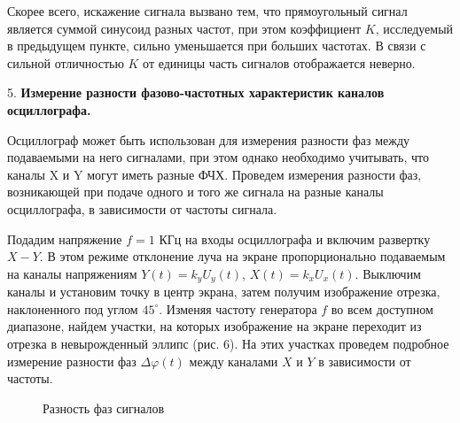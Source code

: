 \documentclass[14pt]{article}
\begin{document}
\begin{figure}[h!!]
	\label{fig:image}
\end{figure}

\newpage

Скорее всего, искажение сигнала вызвано тем, что прямоугольный сигнал является суммой синусоид разных частот, при этом коэффициент $K$, исследуемый в предыдущем пункте, сильно уменьшается при больших частотах. В связи с сильной отличностью $K$ от единицы часть сигналов отображается неверно.

\vspace{0.5cm}
5. \textbf{Измерение разности фазово-частотных характеристик каналов осциллографа.}

Осциллограф может быть использован для измерения разности фаз между подаваемыми на него сигналами, при этом однако необходимо учитывать, что каналы X и Y могут иметь разные ФЧХ. Проведем измерения разности фаз, возникающей при подаче одного и того же сигнала на разные каналы осциллографа, в зависимости от частоты сигнала.

Подадим напряжение $f = 1$ КГц на входы осциллографа и включим развертку $X-Y$. В этом режиме отклонение луча на экране пропорционально подаваемым на каналы напряжениям $Y(t) = k_yU_y(t)$, $X	(t) = k_xU_x(t)$. Выключим каналы и установим точку в центр экрана, затем получим изображение отрезка, наклоненного под углом $45^{\circ}$. Изменяя частоту генератора $f$ во всем доступном диапазоне, найдем участки, на которых изображение на экране переходит из отрезка в невырожденный эллипс (рис. 6). На этих участках проведем подробное измерение разности фаз $\Delta \varphi(t)$ между каналами $X$ и $Y$ в зависимости от частоты.

\begin{figure}[h!]
	\caption{Разность фаз сигналов}
	\label{fig:image}
\end{figure}
\end{document}
